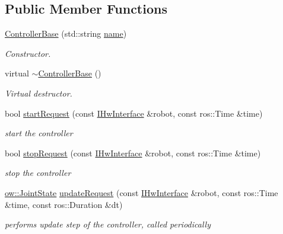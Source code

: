 \subsection*{Public Member Functions}
\begin{DoxyCompactItemize}
\item 
\hyperlink{classow_1_1ControllerBase_a0e385224b3308f6bd99849d4d1b46561}{Controller\+Base} (std\+::string \hyperlink{classow_1_1GenericModuleBase_a4b712883728cdbab7779e27f9a23689c}{name})\hypertarget{classow_1_1ControllerBase_a0e385224b3308f6bd99849d4d1b46561}{}\label{classow_1_1ControllerBase_a0e385224b3308f6bd99849d4d1b46561}

\begin{DoxyCompactList}\small\item\em Constructor. \end{DoxyCompactList}\item 
virtual \hyperlink{classow_1_1ControllerBase_aac321595ce9663834b8645a4f4e3488e}{$\sim$\+Controller\+Base} ()\hypertarget{classow_1_1ControllerBase_aac321595ce9663834b8645a4f4e3488e}{}\label{classow_1_1ControllerBase_aac321595ce9663834b8645a4f4e3488e}

\begin{DoxyCompactList}\small\item\em Virtual destructor. \end{DoxyCompactList}\item 
bool \hyperlink{classow_1_1ControllerBase_aad889e0a532f0b1c012c3d750e46b735}{start\+Request} (const \hyperlink{classow_1_1IHwInterface}{I\+Hw\+Interface} \&robot, const ros\+::\+Time \&time)
\begin{DoxyCompactList}\small\item\em start the controller \end{DoxyCompactList}\item 
bool \hyperlink{classow_1_1ControllerBase_a64b841b0cdda15cdce45f5d3eae57e27}{stop\+Request} (const \hyperlink{classow_1_1IHwInterface}{I\+Hw\+Interface} \&robot, const ros\+::\+Time \&time)
\begin{DoxyCompactList}\small\item\em stop the controller \end{DoxyCompactList}\item 
\hyperlink{classow__core_1_1JointState}{ow\+::\+Joint\+State} \hyperlink{classow_1_1ControllerBase_a1e040a4a3cb41c17a5b4738c81f0c7a3}{update\+Request} (const \hyperlink{classow_1_1IHwInterface}{I\+Hw\+Interface} \&robot, const ros\+::\+Time \&time, const ros\+::\+Duration \&dt)
\begin{DoxyCompactList}\small\item\em performs update step of the controller, called periodically \end{DoxyCompactList}\end{DoxyCompactItemize}
